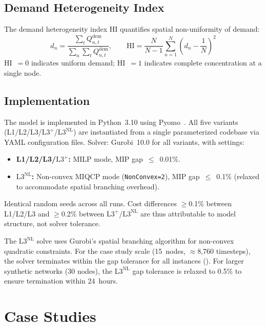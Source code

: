 \documentclass[review,3p]{elsarticle}
\newcommand{\Lplus}{\mathrm{L3}^{+}}
\newcommand{\Lnl}{\mathrm{L3}^{\mathrm{NL}}}
\begin{document}
\subsection{Demand Heterogeneity Index}
\label{sec:model_hi}

The demand heterogeneity index HI quantifies spatial non-uniformity
of demand:
\begin{equation}
d_n = \frac{\sum_t Q_{n,t}^{\mathrm{dem}}}{\sum_n \sum_t
Q_{n,t}^{\mathrm{dem}}}, \qquad
\mathrm{HI} = \frac{N}{N-1} \sum_{n=1}^{N}
\left(d_n - \frac{1}{N}\right)^2
\label{eq:hi}
\end{equation}
HI~$=0$ indicates uniform demand; HI~$=1$ indicates complete
concentration at a single node.

\subsection{Implementation}
\label{sec:model_impl}

The model is implemented in Python~3.10 using
Pyomo~\cite{pyomo}. All five variants (L1/L2/L3/$\Lplus$/$\Lnl$)
are instantiated from a single parameterized codebase via YAML
configuration files. Solver: Gurobi~10.0 for all variants, with
settings:
\begin{itemize}[nosep]
    \item \textbf{L1/L2/L3/$\Lplus$:} MILP mode,
    MIP gap~$\leq$~0.01\%.
    \item \textbf{$\Lnl$:} Non-convex MIQCP mode
    (\texttt{NonConvex=2}), MIP gap~$\leq$~0.1\%
    (relaxed to accommodate spatial branching overhead).
\end{itemize}
Identical random seeds across all runs. Cost differences
$\geq$0.1\% between L1/L2/L3 and $\geq$0.2\% between
$\Lplus$/$\Lnl$ are thus attributable to model structure, not
solver tolerance.

The $\Lnl$ solve uses Gurobi's spatial branching algorithm for
non-convex quadratic constraints. For the case study scale
(15~nodes, $\approx$8,760 timesteps), the solver terminates within
the gap tolerance for all instances ().
For larger synthetic networks (30 nodes), the $\Lnl$ gap tolerance
is relaxed to 0.5\% to ensure termination within 24~hours.

\section{Case Studies}
\label{sec:case_studies}
\end{document}

